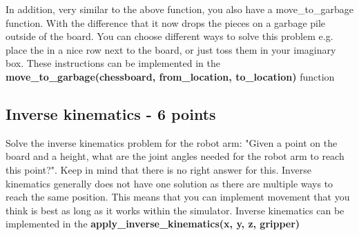 \documentclass{article}
\begin{document}
In addition, very similar to the above function, you also have a move\_to\_garbage function. With the difference that it now drops the pieces on a garbage pile outside of the board. You can choose different ways to solve this problem e.g. place the in a nice row next to the board, or just toss them in your imaginary box. These instructions can be implemented in the \textbf{move\_to\_garbage(chessboard, from\_location, to\_location)} function

\subsection*{Inverse kinematics - 6 points}
Solve the inverse kinematics problem for the robot arm: "Given a point on the board and a height, what are the joint angles needed for the robot arm to reach this point?". Keep in mind that there is no right answer for this. Inverse kinematics generally does not have one solution as there are multiple ways to reach the same position. This means that you can implement movement that you think is best as long as it works within the simulator. Inverse kinematics can be implemented in the \textbf{apply\_inverse\_kinematics(x, y, z, gripper)}
\end{document}
